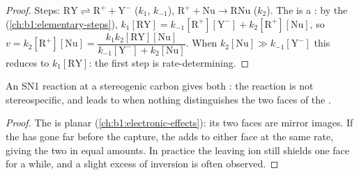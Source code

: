 \begin{proof}
Steps: $\mathrm{RY} \rightleftharpoons \mathrm{R^+} + \mathrm{Y^-}$ ($k_1$,
$k_{-1}$), $\mathrm{R^+} + \mathrm{Nu} \to \mathrm{RNu}$ ($k_2$). The
 is a : by the  (\cref{ch:b1:elementary-steps}), $k_1[\mathrm{RY}] =
k_{-1}[\mathrm{R^+}][\mathrm{Y^-}] + k_2[\mathrm{R^+}][\mathrm{Nu}]$, so
$v = k_2[\mathrm{R^+}][\mathrm{Nu}] = \dfrac{k_1k_2[\mathrm{RY}][\mathrm{Nu}]}
{k_{-1}[\mathrm{Y^-}] + k_2[\mathrm{Nu}]}$. When $k_2[\mathrm{Nu}] \gg
k_{-1}[\mathrm{Y^-}]$ this reduces to $k_1[\mathrm{RY}]$: the first step is
rate-determining.
\end{proof}

\begin{proposition}[Stereochemistry of SN1]\label{prop:b1:nucleophilic-substitution:sn1-stereo}
An SN1 reaction at a stereogenic carbon gives both : the
reaction is not stereospecific, and leads to  when nothing
distinguishes the two faces of the .
\end{proposition}

\begin{proof}
The  is planar (\cref{ch:b1:electronic-effects}): its two
faces are mirror images. If the  has gone far before the
capture, the  adds to either face at the same rate, giving the
two  in equal amounts. In practice the leaving ion still
shields one face for a while, and a slight excess of inversion is often
observed.
\end{proof}

